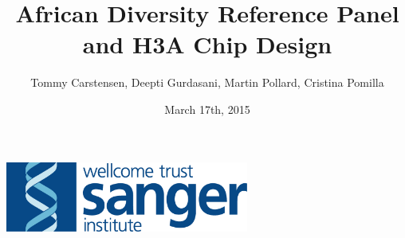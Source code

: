 \documentclass{article}
\title{African Diversity Reference Panel and H3A Chip Design}
\author{Tommy Carstensen, Deepti Gurdasani, Martin Pollard, Cristina Pomilla}
\date{March 17th, 2015}
\begin{document}
\maketitle
\centerline{\includegraphics[width=80mm]{sang_logo_large}}













\end{document}
